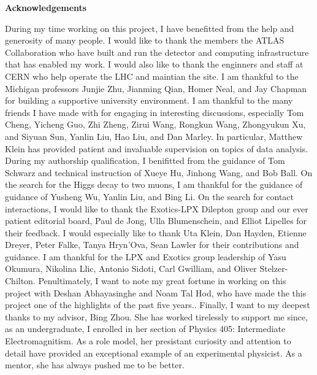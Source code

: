 \begin{center}
\textbf{\LARGE Acknowledgements}
\end{center} 

During my time working on this project, I have benefitted from the help and generosity of many people.
I would like to thank the members the ATLAS Collaboration who have built and run the detector and computing infrastructure that has enabled my work.
I would also like to thank the enginners and staff at CERN who help operate the LHC and maintian the site.
I am thankful to the Michigan professors Junjie Zhu, Jianming Qian, Homer Neal, and Jay Chapman for building a supportive university environment.
I am thankful to the many friends I have made with for engaging in interesting discussions, especially Tom Cheng, Yicheng Guo, Zhi Zheng, Zirui Wang, Rongkun Wang, Zhongyukun Xu, and Siyuan Sun, Yanlin Liu, Hao Liu, and Dan Marley.
In particular, Matthew Klein has provided patient and invaluable supervision on topics of data analysis.
During my authorship qualification, I benifitted from the guidance of Tom Schwarz and technical instruction of Xueye Hu, Jinhong Wang, and Bob Ball.
On the search for the Higgs decay to two muons, I am thankful for the guidance of guidance of Yusheng Wu, Yanlin Liu, and Bing Li.
On the search for contact interactions, I would like to thank the Exotics-LPX Dilepton group and our ever patient editorial board, Paul de Jong, Ulla Blumenschein, and Elliot Lipelles for their feedback.
I would especially like to thank Uta Klein, Dan Hayden, Etienne Dreyer, Peter Falke, Tanya Hryn'Ova, Sean Lawler for their contributions and guidance.
I am thankful for the LPX and Exotics group leadership of Yasu Okumura, Nikolina Llic, Antonio Sidoti, Carl Gwilliam, and Oliver Stelzer-Chilton.
Penultimately, I want to note my great fortune in working on this project with Deshan Abhayasinghe and Noam Tal Hod, who have made the this project one of the highlights of the past five years..
Finally, I want to my deepest thanks to my advisor, Bing Zhou.
She has worked tirelessly to support me since, as an undergraduate, I enrolled in her section of Physics 405: Intermediate Electromagnitism.
As a role model, her presistant curiosity and attention to detail have provided an exceptional example of an experimental physicist. 
As a mentor, she has always pushed me to be better.


